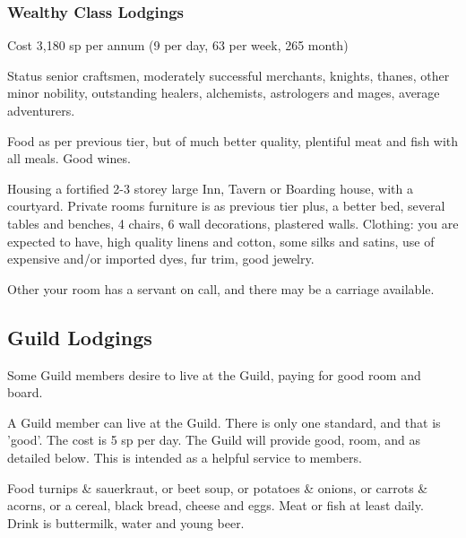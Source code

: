 \documentclass[twoside,a4paper]{article}
\begin{document}
\begin{multicols}{2}
\subsubsection{Wealthy Class Lodgings}

\begin{idesc}

\item[Cost] 3,180 sp per annum (9 per day, 63 per week, 265 month)

\item[Status] senior craftsmen, moderately successful merchants,
knights, thanes, other minor nobility, outstanding healers,
alchemists, astrologers and mages, average adventurers.

\item[Food] as per previous tier, but of much better quality,
plentiful meat and fish with all meals. Good wines.

\item[Housing] a fortified 2-3 storey large Inn, Tavern or Boarding
house, with a courtyard. Private rooms furniture is as previous tier
plus, a better bed, several tables and benches, 4 chairs, 6 wall
decorations, plastered walls. Clothing: you are expected to have, high
quality linens and cotton, some silks and satins, use of expensive
and/or imported dyes, fur trim, good jewelry.

\item[Other] your room has a servant on call, and there
may be a carriage available.

\end{idesc}


\subsection{Guild Lodgings}
\label{guildlodgings}

Some Guild members desire to live at the Guild, paying for good room
and board.

A Guild member can live at the Guild. There is only one standard, and
that is 'good'. The cost is 5 sp per day. The Guild will provide
good, room, and as detailed below. This is intended as a helpful
service to members.

\begin{idesc}

\item[Food] turnips \& sauerkraut, or beet soup, or potatoes \&
onions, or carrots \& acorns, or a cereal, black bread, cheese and
eggs. Meat or fish at least daily. Drink is buttermilk, water and
young beer.


\end{idesc}
\end{multicols}
\end{document}
